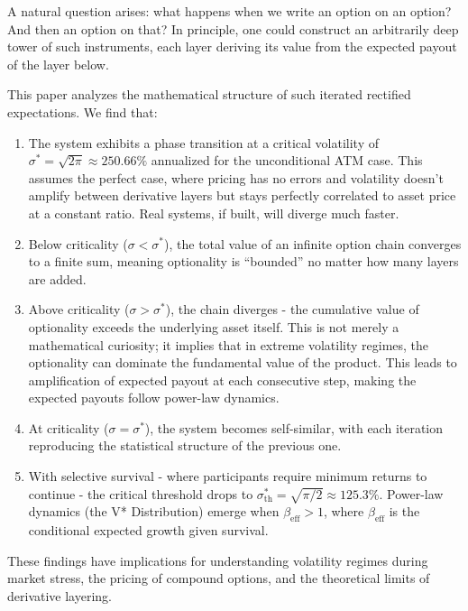 \documentclass[
  11pt,
  openany]{article}
\renewcommand{\labelenumi}{\arabic{enumi}.}
\begin{document}
A natural question arises: what happens when we write an option on an
option? And then an option on that? In principle, one could construct an
arbitrarily deep tower of such instruments, each layer deriving its
value from the expected payout of the layer below.

This paper analyzes the mathematical structure of such iterated
rectified expectations. We find that:

\begin{enumerate}
\def\labelenumi{\arabic{enumi}.}
\item
  The system exhibits a phase transition at a critical volatility of
  \(\sigma^* = \sqrt{2\pi} \approx 250.66\%\) annualized for the
  unconditional ATM case. This assumes the perfect case, where pricing
  has no errors and volatility doesn't amplify between derivative layers
  but stays perfectly correlated to asset price at a constant ratio.
  Real systems, if built, will diverge much faster.
\item
  Below criticality (\(\sigma < \sigma^*\)), the total value of an
  infinite option chain converges to a finite sum, meaning optionality
  is ``bounded'' no matter how many layers are added.
\item
  Above criticality (\(\sigma > \sigma^*\)), the chain diverges - the
  cumulative value of optionality exceeds the underlying asset itself.
  This is not merely a mathematical curiosity; it implies that in
  extreme volatility regimes, the optionality can dominate the
  fundamental value of the product. This leads to amplification of
  expected payout at each consecutive step, making the expected payouts
  follow power-law dynamics.
\item
  At criticality (\(\sigma = \sigma^*\)), the system becomes
  self-similar, with each iteration reproducing the statistical
  structure of the previous one.
\item
  With selective survival - where participants require minimum returns
  to continue - the critical threshold drops to
  \(\sigma_{\text{th}}^{*} = \sqrt{\pi/2} \approx 125.3\%\). Power-law
  dynamics (the V* Distribution) emerge when \(\beta_{\text{eff}} > 1\),
  where \(\beta_{\text{eff}}\) is the conditional expected growth given
  survival.
\end{enumerate}

These findings have implications for understanding volatility regimes
during market stress, the pricing of compound options, and the
theoretical limits of derivative layering.
\end{document}
